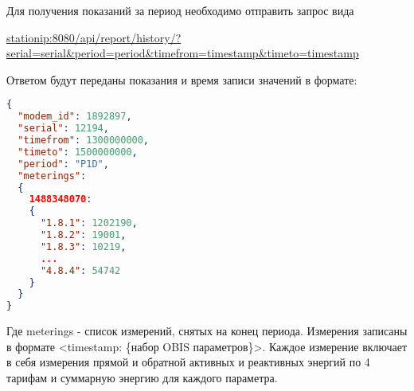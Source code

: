 Для получения показаний за период необходимо отправить запрос вида 
\smallskip

\url{stationip:8080/api/report/history/?serial=serial&period=period&timefrom=timestamp&timeto=timestamp} 

\bigskip

Ответом будут переданы показания и время записи значений в формате:

\bigskip

\begin{lstlisting}[language=json,firstnumber=1]
{
  "modem_id": 1892897,
  "serial": 12194,
  "timefrom": 1300000000,
  "timeto": 1500000000,
  "period": "P1D",
  "meterings": 
  {
    1488348070: 
    {
      "1.8.1": 1202190,
      "1.8.2": 19001,
      "1.8.3": 10219,
      ...
      "4.8.4": 54742
    }
  }
}
\end{lstlisting}

\bigskip

Где meterings - список измерений, снятых на конец периода. Измерения записаны в формате <timestamp: \{набор OBIS параметров\}>. Каждое измерение включает в себя измерения прямой и обратной активных и реактивных энергий по 4 тарифам и суммарную энергию для каждого параметра.